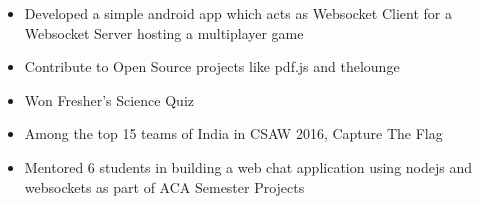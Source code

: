 
{\fontsize{11pt}{1em}\bodyfontlight\upshape\color{text}
  \begin{itemize}
  \item Developed a simple android app which acts as Websocket Client for a
    Websocket Server hosting a multiplayer game
  \item Contribute to Open Source projects like pdf.js and thelounge
  \item Won Fresher's Science Quiz
  \item Among the top 15 teams of India in CSAW 2016, Capture The Flag
  \item Mentored 6 students in building a web chat application using nodejs and
    websockets as part of ACA Semester Projects
  \end{itemize}
}